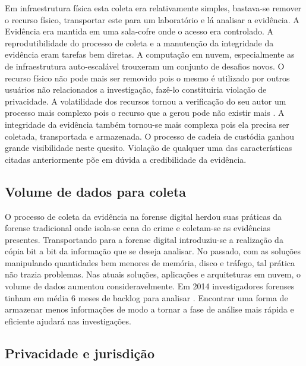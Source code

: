 Em infraestrutura física esta coleta era relativamente simples, bastava-se remover o recurso físico, transportar este para um laboratório e lá analisar a evidência. A Evidência era mantida em uma sala-cofre onde o acesso era controlado.
%
A reprodutibilidade do processo de coleta e a manutenção da integridade da evidência eram tarefas bem diretas.
%
A computação em nuvem, especialmente as de infraestrutura auto-escalável trouxeram um conjunto de desafios novos. 
%
O recurso físico não pode mais ser removido pois o mesmo é utilizado por outros usuários não relacionados a investigação, fazê-lo constituiria violação de privacidade.
%
A volatilidade dos recursos tornou a verificação do seu autor um processo mais complexo pois o recurso que a gerou pode não existir mais \cite{SimouCloudChlng:2014}.
%
A integridade da evidência também tornou-se mais complexa pois ela precisa ser coletada, transportada e armazenada. O processo de cadeia de custódia ganhou grande visibilidade neste quesito.
%
Violação de qualquer uma das características citadas anteriormente põe em dúvida a credibilidade da evidência.

\subsection{Volume de dados para coleta}
\label{sec:volumedados}

O processo de coleta da evidência na forense digital herdou suas práticas da forense tradicional onde isola-se cena do crime e coletam-se as evidências presentes. 
%
Transportando para a forense digital introduziu-se a realização da cópia bit a bit da informação que se deseja analisar.
%
No passado, com as soluções manipulando quantidades bem menores de memória, disco e tráfego, tal prática não trazia problemas. Nas atuais soluções, aplicações e arquiteturas em nuvem, o volume de dados aumentou consideravelmente.
%
Em 2014 investigadores forenses tinham em média 6 meses de backlog para analisar \cite{QuickIncreaseVolumeImpact:2014}. 
%
Encontrar uma forma de armazenar menos informações de modo a tornar a fase de análise mais rápida e eficiente ajudará nas investigações.

\subsection{Privacidade e jurisdição}
\label{sec:violacaoprivacidadejuriscdicao}

